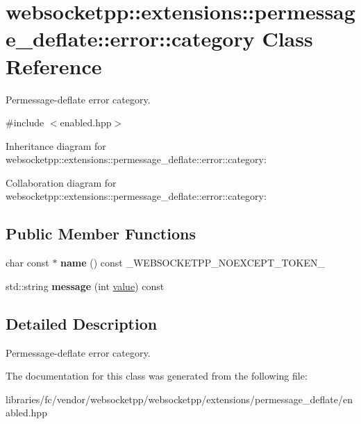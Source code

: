 \hypertarget{classwebsocketpp_1_1extensions_1_1permessage__deflate_1_1error_1_1category}{}\section{websocketpp\+:\+:extensions\+:\+:permessage\+\_\+deflate\+:\+:error\+:\+:category Class Reference}
\label{classwebsocketpp_1_1extensions_1_1permessage__deflate_1_1error_1_1category}


Permessage-\/deflate error category.  




{\ttfamily \#include $<$enabled.\+hpp$>$}



Inheritance diagram for websocketpp\+:\+:extensions\+:\+:permessage\+\_\+deflate\+:\+:error\+:\+:category\+:


Collaboration diagram for websocketpp\+:\+:extensions\+:\+:permessage\+\_\+deflate\+:\+:error\+:\+:category\+:
\subsection*{Public Member Functions}
\begin{DoxyCompactItemize}
\item 
\mbox{\label{classwebsocketpp_1_1extensions_1_1permessage__deflate_1_1error_1_1category_a042aa64aca0a9118cda65c25e8fbb83b}} 
char const  $\ast$ {\bfseries name} () const \+\_\+\+W\+E\+B\+S\+O\+C\+K\+E\+T\+P\+P\+\_\+\+N\+O\+E\+X\+C\+E\+P\+T\+\_\+\+T\+O\+K\+E\+N\+\_\+
\item 
\mbox{\label{classwebsocketpp_1_1extensions_1_1permessage__deflate_1_1error_1_1category_a1c1ff476766b3f9bb115a92ec809c01e}} 
std\+::string {\bfseries message} (int \mbox{\hyperlink{namespacewebsocketpp_1_1extensions_1_1permessage__deflate_1_1error_a38e53d7586dd60059cc99a5833bbe54e}{value}}) const
\end{DoxyCompactItemize}


\subsection{Detailed Description}
Permessage-\/deflate error category. 

The documentation for this class was generated from the following file\+:\begin{DoxyCompactItemize}
\item 
libraries/fc/vendor/websocketpp/websocketpp/extensions/permessage\+\_\+deflate/enabled.\+hpp\end{DoxyCompactItemize}

